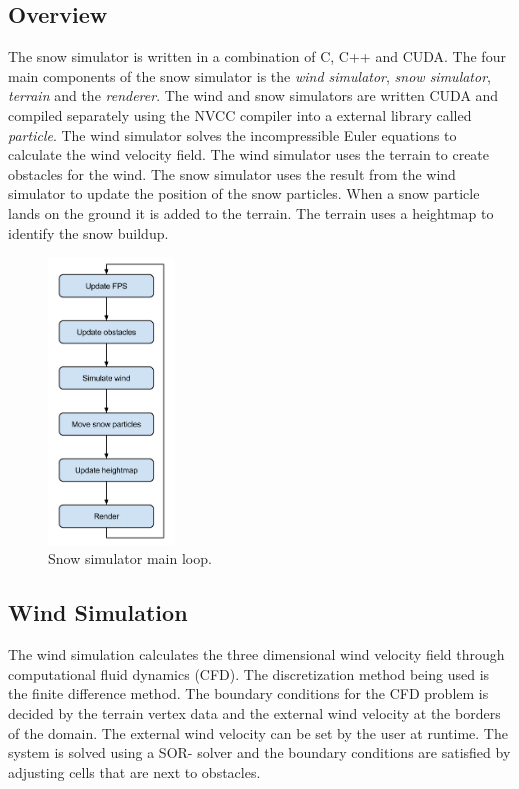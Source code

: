 \subsection{Overview}

The snow simulator is written in a combination of C, C++ and CUDA.
The four main components of the snow simulator is the \emph{wind simulator}, 
\emph{snow simulator}, \emph{terrain} and the \emph{renderer}. The wind and 
snow simulators are written CUDA and compiled separately using the NVCC compiler 
into a external library called \emph{particle}. The wind simulator 
solves the incompressible Euler equations to calculate the wind velocity field. 
The wind simulator uses the terrain to create obstacles for the wind. The snow 
simulator uses the result from the wind simulator to update the position of the 
snow particles. When a snow particle lands on the ground it is added to the terrain.
The terrain uses a heightmap to identify the snow buildup.

\begin{figure}[ht]
	\center
	\includegraphics[width=0.30\textwidth]{images/snow_sim_main_loop}
	\caption{Snow simulator main loop.}
	\label{fig:mainLoop}
\end{figure}

\subsection{Wind Simulation}

The wind simulation calculates the three dimensional wind velocity field through
computational fluid dynamics (CFD). The discretization method being used is the
finite difference method. The boundary conditions for the CFD problem is decided
by the terrain vertex data and the external wind velocity at the borders of the
domain. The external wind velocity can be set by the user at runtime. The system
is solved using a SOR- solver and the boundary conditions are satisfied by
adjusting cells that are next to obstacles.

